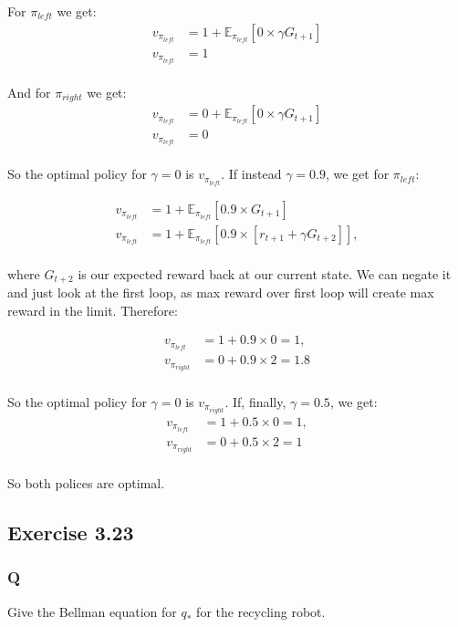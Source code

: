 For $\pi_{left}$ we get:
\begin{align}
v_{\pi_{left}} &= 1 + \mathbb{E}_{\pi_{left}} \left[0 \times \gamma G_{t+1} \right] \\
v_{\pi_{left}} &= 1 \\
\end{align}

And for $\pi_{right}$ we get:
\begin{align}
v_{\pi_{left}} &= 0 + \mathbb{E}_{\pi_{left}} \left[0 \times \gamma G_{t+1} \right] \\
v_{\pi_{left}} &= 0 \\\
\end{align}

So the optimal policy for $\gamma = 0$ is $v_{\pi_{left}}$. If instead $\gamma = 0.9$, we get for $\pi_{left}$:

\begin{align}
v_{\pi_{left}} &= 1 + \mathbb{E}_{\pi_{left}} \left[0.9 \times G_{t+1} \right] \\
v_{\pi_{left}} &= 1 + \mathbb{E}_{\pi_{left}} \left[0.9 \times [r_{t+1} + \gamma G_{t+2}] \right],  \\
\end{align}

where $G_{t+2}$ is our expected reward back at our current state. We can negate it and just look at the first loop, as max reward over first loop will create max reward in the limit. Therefore:

\begin{align}
v_{\pi_{left}} &= 1 + 0.9 \times 0 = 1,\\
v_{\pi_{right}} &= 0 + 0.9 \times 2 = 1.8  \\
\end{align}

So the optimal policy for $\gamma = 0$ is $v_{\pi_{right}}$. If, finally, $\gamma = 0.5$, we get:
\begin{align}
v_{\pi_{left}} &= 1 + 0.5 \times 0 = 1,\\
v_{\pi_{right}} &= 0 + 0.5 \times 2 = 1  \\
\end{align}

So both polices are optimal.

\subsection{Exercise 3.23}
\subsubsection*{Q}
Give the Bellman equation for $q_*$ for the recycling robot.


